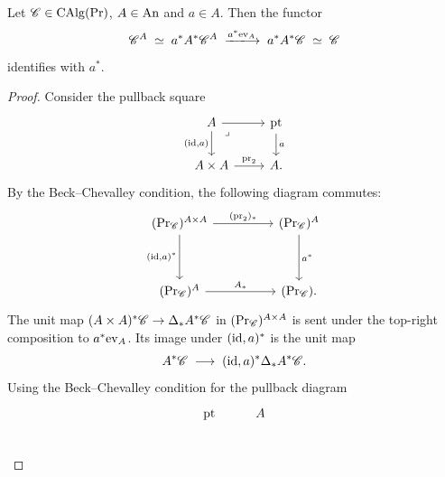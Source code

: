 \documentclass[english,svgnames,table]{article}
\begin{document}
    \begin{lemma}
    \label{lem:trivA-at-a-point}
        Let $\mathscr{C} \in \operatorname{CAlg}(\operatorname{Pr})$, $A \in \mathrm{An}$ and $a \in A$.
        Then the functor
        \begin{equation*}
            \cC^A \;\simeq\; a^* A^* \cC^A \;\xtoo{a^* \ev_A}\; a^* A^* \cC \;\simeq\; \cC
        \end{equation*}
        identifies with $a^*$.
    \end{lemma}
    \begin{proof}
        Consider the pullback square
        \begin{equation*}
            \begin{tikzcd}
                A & \pt \\
                {A \times A} & A.
                \arrow[from=1-1, to=1-2]
                \arrow["{(\id, a)}"', from=1-1, to=2-1]
                \arrow["\lrcorner"{anchor=center, pos=0.125}, draw=none, from=1-1, to=2-2]
                \arrow["a", from=1-2, to=2-2]
                \arrow["{\pr_2}", from=2-1, to=2-2]
            \end{tikzcd}
        \end{equation*}
        By the Beck--Chevalley condition, the following diagram commutes:
        \begin{equation*}
            \begin{tikzcd}
                {(\ModC)^{A\times A}} && {(\ModC)^A} \\
                \\
                {(\ModC)^A} && (\ModC).
                \arrow["{(\pr_2)_*}", from=1-1, to=1-3]
                \arrow["{(\id, a)^*}"', from=1-1, to=3-1]
                \arrow["{a^*}", from=1-3, to=3-3]
                \arrow["{A_*}", from=3-1, to=3-3]
            \end{tikzcd}
        \end{equation*}
        The unit map $(A \times A)^* \mathscr{C} \to \Delta_* A^* \mathscr{C}$ in $(\operatorname{Pr}_{\mathscr{C}})^{A \times A}$ is sent under the top-right composition to $a^* \mathrm{ev}_A$. Its image under $(\mathrm{id}, a)^*$ is the unit map
        \begin{equation*}
            A^* \mathscr{C} \;\longrightarrow\; (\mathrm{id}, a)^* \Delta_* A^* \mathscr{C}.
        \end{equation*}
        Using the Beck--Chevalley condition for the pullback diagram
        \begin{equation*}
            \begin{tikzcd}
                \pt & A \\

\end{tikzcd}
\end{equation*}
\end{proof}
\end{document}
